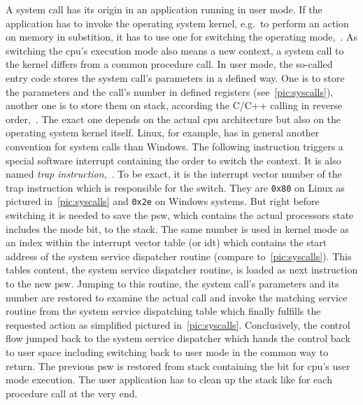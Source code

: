 A system call has its origin in an application running in user mode.
If the application has to invoke the operating system kernel, e.g.\ to perform an action on memory in substition, it has to use one for switching the operating mode\cite{glatz2015betriebssysteme},~\cite{tanenbaum-modern-operating-systems}.
As switching the \ac{cpu}'s execution mode also means a new context, a system call to the kernel differs from a common procedure call.
In user mode, the so-called entry code stores the system call's parameters in a defined way.
One is to store the parameters and the call's number in defined registers (see~\ref{pic:syscalls}), another one is to store them on stack, according the C/C++ calling in reverse order\cite{silberschatz2009operating},~\cite{glatz2015betriebssysteme}.
The exact one depends on the actual \ac{cpu} architecture but also on the operating system kernel itself.
Linux, for example, has in general another convention for system calls than Windows. 
The following instruction triggers a special software interrupt containing the order to switch the context.
It is also named \textit{trap instruction}\cite{glatz2015betriebssysteme},~\cite{tanenbaum-modern-operating-systems}.
To be exact, it is the interrupt vector number of the trap instruction which is responsible for the switch.
They are \texttt{0x80} on Linux as pictured in~\ref{pic:syscalls} and \texttt{0x2e} on Windows systems\cite{glatz2015betriebssysteme}.
But right before switching it is needed to save the \acf{psw}, which contains the actual processors state includes the mode bit, to the stack.
The same number is used in kernel mode as an index within the interrupt vector table (or \acf{idt}) which contains the start address of the system service dispatcher routine (compare to~\ref{pic:syscalls}).
This tables content, the system service dispatcher routine, is loaded as next instruction to the new \ac{psw}\cite{brause2017betriebssysteme}.
Jumping to this routine, the system call's parameters and its number are restored to examine the actual call and invoke the matching service routine from the system service dispatching table which finally fulfills the requested action as simplified pictured in~\ref{pic:syscalls}\cite{glatz2015betriebssysteme}.
Conclusively, the control flow jumped back to the system service dispatcher which hands the control back to user space including switching back to user mode in the common way to return\cite{glatz2015betriebssysteme}.
The previous \ac{psw} is restored from stack containing the bit for \ac{cpu}'s user mode execution.
The user application has to clean up the stack like for each procedure call at the very end\cite{tanenbaum-modern-operating-systems}.

